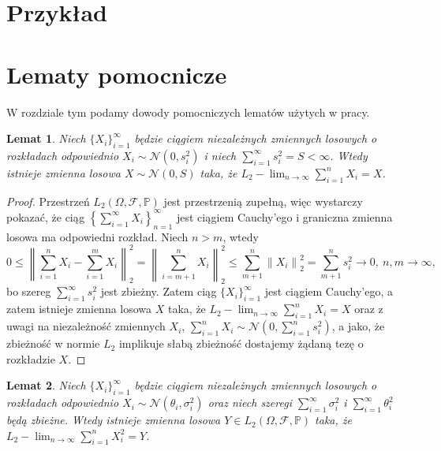 \documentclass{mwart}
\newtheorem{lm}{Lemat}
\newcommand{\norm}[1]{\left\lVert#1\right\rVert}
\begin{document}
\section{Przykład}\label{przyklad}









\section{Lematy pomocnicze}\label{lematy}
W rozdziale tym podamy dowody pomocniczych lematów użytych w pracy.
\begin{lm}\label{pierwsza}
Niech $\{X_i\}_{i=1}^{\infty}$ będzie ciągiem niezależnych zmiennych losowych o rozkładach odpowiednio $X_i\sim \mathcal{N}(0,s_i^2)$ i niech $\sum_{i=1}^{\infty}s_i^2=S<\infty$. Wtedy istnieje zmienna losowa $X\sim\mathcal{N}(0,S)$ taka, że $L_2- \lim_{n\to \infty}\sum_{i=1}^nX_i=X$.
\end{lm}
\begin{proof}
Przestrzeń $L_2(\Omega,\mathcal{F},\mathbb{P})$ jest przestrzenią zupełną, więc wystarczy pokazać, że ciąg $\left\{\sum_{i=1}^{\infty}X_i\right\}_{n=1}^{\infty}$ jest ciągiem Cauchy'ego i graniczna zmienna losowa ma odpowiedni rozkład. Niech $n>m$, wtedy
\begin{displaymath}
0\leq \norm{\sum_{i=1}^{n}X_i-\sum_{i=1}^{m}X_i}_2^2=\norm{\sum_{i=m+1}^{n}X_i}_2^2\leq \sum_{m+1}^n\norm{X_i}_2^2=\sum_{m+1}^ns_i^2\to 0,\ n,m\to \infty,
\end{displaymath}
bo szereg $\sum_{i=1}^{\infty}s_i^2$ jest zbieżny. Zatem ciąg $\{X_i\}_{i=1}^{\infty}$ jest ciągiem Cauchy'ego, a zatem istnieje zmienna losowa $X$ taka, że $L_2- \lim_{n\to \infty}\sum_{i=1}^nX_i=X$ oraz z uwagi na niezależność zmiennych $X_i$, $\sum_{i=1}^nX_i\sim\mathcal{N}(0,\sum_{i=1}^ns_i^2)$, a jako, że zbieżność w normie $L_2$ implikuje słabą zbieżność dostajemy żądaną tezę o rozkładzie $X$.
\end{proof}
\begin{lm}\label{druga}
Niech $\{X_i\}_{i=1}^{\infty}$ będzie ciągiem niezależnych zmiennych losowych o rozkładach odpowiednio $X_i\sim \mathcal{N}(\theta_i,\sigma_i^2)$ oraz niech szeregi $\sum_{i=1}^{\infty}\sigma_i^2$ i $\sum_{i=1}^{\infty}\theta_i^2$ będą zbieżne. Wtedy istnieje zmienna losowa $Y\in L_2(\Omega,\mathcal{F},\mathbb{P})$ taka, że $L_2- \lim_{n\to \infty}\sum_{i=1}^nX_i^2=Y$.
\end{lm}
\end{document}
